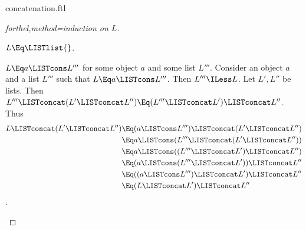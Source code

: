\documentclass[lang=en,debug=all]{stex}
\begin{document}
\begin{smodule}{concatenation.ftl}
\begin{proof}[forthel,method=induction on $L$]
  \begin{case}{$L \Eq \LISTlist{}$.} \end{case}

  \begin{case}{$L \Eq a \LISTcons L'''$ for some object $a$ and some list $L'''$.}
    Consider an object $a$ and a list $L'''$ such that $L \Eq a \LISTcons L'''$.
    Then $L''' \ILess L$.
    Let $L',L''$ be lists.
    Then $L''' \LISTconcat (L' \LISTconcat L'') \Eq (L''' \LISTconcat L') \LISTconcat L''$.
    Thus
    \begin{align*}
      L \LISTconcat (L' \LISTconcat L'') 
        &\Eq (a \LISTcons L''') \LISTconcat (L' \LISTconcat L'')\\
        &\Eq a \LISTcons (L''' \LISTconcat (L' \LISTconcat L''))\\
        &\Eq a \LISTcons ((L''' \LISTconcat L') \LISTconcat L'')\\
        &\Eq (a \LISTcons (L''' \LISTconcat L')) \LISTconcat L''\\
        &\Eq ((a \LISTcons L''') \LISTconcat L') \LISTconcat L''\\
        &\Eq (L \LISTconcat L') \LISTconcat L''
    \end{align*}.
  \end{case}
\end{proof}
\end{smodule}
\end{document}
